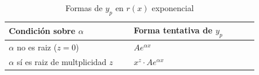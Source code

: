 \begin{table}[H]
\centering
\caption{Formas de $y_{p}$ en $r(x)$ exponencial}
\label{tab:eq_exponencial}
\begin{threeparttable}
{
\begin{tabular}{p{0.45\linewidth}p{0.45\linewidth}}\hline

    \textbf{Condición sobre $\alpha$} & \textbf{Forma tentativa de $y_{p}$} \\ \hline

    $\alpha$ no es raiz ($z = 0$) & $Ae^{\alpha x}$ \\
    $\alpha$ sí es raiz de multplicidad $z$ & $x^{z} \cdot Ae^{\alpha x}$ \\
    
    \hline
\end{tabular}
}
\begin{tablenotes} %
    \item[] 
\end{tablenotes}
\end{threeparttable}
\end{table}